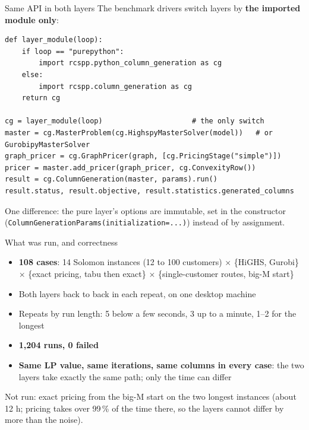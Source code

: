 \documentclass[aspectratio=169]{beamer}
\begin{document}
\begin{frame}[fragile]{Same API in both layers}
  The benchmark drivers switch layers by \textbf{the imported module only}:

  \vspace{0.3em}
\begin{lstlisting}
def layer_module(loop):
    if loop == "purepython":
        import rcspp.python_column_generation as cg
    else:
        import rcspp.column_generation as cg
    return cg

cg = layer_module(loop)                     # the only switch
master = cg.MasterProblem(cg.HighspyMasterSolver(model))   # or GurobipyMasterSolver
graph_pricer = cg.GraphPricer(graph, [cg.PricingStage("simple")])
pricer = master.add_pricer(graph_pricer, cg.ConvexityRow())
result = cg.ColumnGeneration(master, params).run()
result.status, result.objective, result.statistics.generated_columns
\end{lstlisting}

  \small One difference: the pure layer's options are immutable, set in the constructor
  (\texttt{ColumnGenerationParams(initialization=...)}) instead of by assignment.
\end{frame}

\begin{frame}{What was run, and correctness}
  \begin{itemize}
    \item \textbf{108 cases}: 14 Solomon instances (12 to 100 customers)
      $\times$ \{HiGHS, Gurobi\} $\times$ \{exact pricing, tabu then exact\} $\times$ \{single-customer routes,
      big-M start\}
    \item Both layers back to back in each repeat, on one desktop machine
    \item Repeats by run length: 5 below a few seconds, 3 up to a minute, 1--2 for the longest
    \item \textbf{1,204 runs, 0 failed}
    \item[$\Rightarrow$] \textbf{Same LP value, same iterations, same columns in every case}: the two layers take
      exactly the same path; only the time can differ
  \end{itemize}

  \vspace{0.5em}
  \small Not run: exact pricing from the big-M start on the two longest instances (about 12 h; pricing takes over
  99\,\% of the time there, so the layers cannot differ by more than the noise).
\end{frame}
\end{document}
